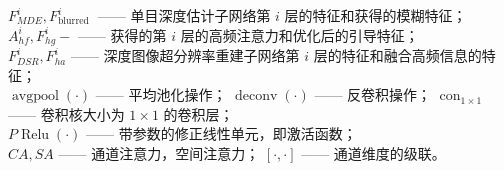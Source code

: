 \documentclass[aspectratio=169,12pt]{beamer}
\begin{document}
\begin{frame}[t]
{\begin{columns}
		\end{columns}
		
		\footnotesize
		$F_{M D E}^{i}, F_{\text {blurred }}^{i}$ —— 单目深度估计子网络第 $i$ 层的特征和获得的模糊特征；\\
		$A_{h f}^{i}, F_{h g}^{i}-$ —— 获得的第 $i$ 层的高频注意力和优化后的引导特征；\\
		$F_{D S R}^{i}, F_{h a}^{i}$ —— 深度图像超分辨率重建子网络第 $i$ 层的特征和融合高频信息的特征；\\
		$\operatorname{avgpool}(\cdot)$  —— 平均池化操作； $\operatorname{deconv}(\cdot)$  —— 反卷积操作； $\operatorname{con}_{1 \times 1}$ —— 卷积核大小为 $1 \times 1$ 的卷积层；\\
		$P \operatorname{Relu}(\cdot)$ —— 带参数的修正线性单元，即激活函数；\\
		$CA, SA$ —— 通道注意力，空间注意力； $[\cdot,\cdot]$ —— 通道维度的级联。
	}
\end{frame}
\end{document}
